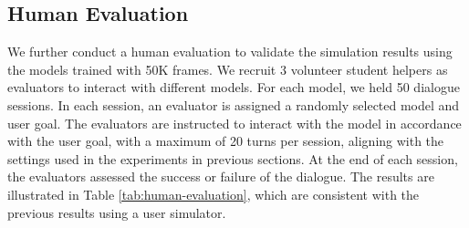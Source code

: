 \documentclass[letterpaper]{article} %
\begin{document}
\subsection{Human Evaluation}
\label{sec:human-eval}
\begin{table}[htbp] 
\vspace{-3mm}
\setlength{\belowcaptionskip}{-0.4cm}   %
\centering
\small
{}
\vspace{-0.5em}
\caption{\label{tab:human-evaluation} Human evaluation results. We use the models trained with 50K frames for all agents. }
\end{table}

We further conduct a human evaluation to validate the simulation results using the models trained with 50K frames. 
We recruit 3 volunteer student helpers as evaluators to interact with different models.  
For each model, we held 50 dialogue sessions.
In each session, an evaluator is assigned a randomly selected model and user goal.
The evaluators are instructed to interact with the model in accordance with the user goal, with a maximum of 20 turns per session, aligning with the settings used in the experiments in previous sections.
At the end of each session, the evaluators assessed the success or failure of the dialogue. 
The results are illustrated in Table \ref{tab:human-evaluation}, which are consistent with the previous results using a user simulator.
\end{document}
